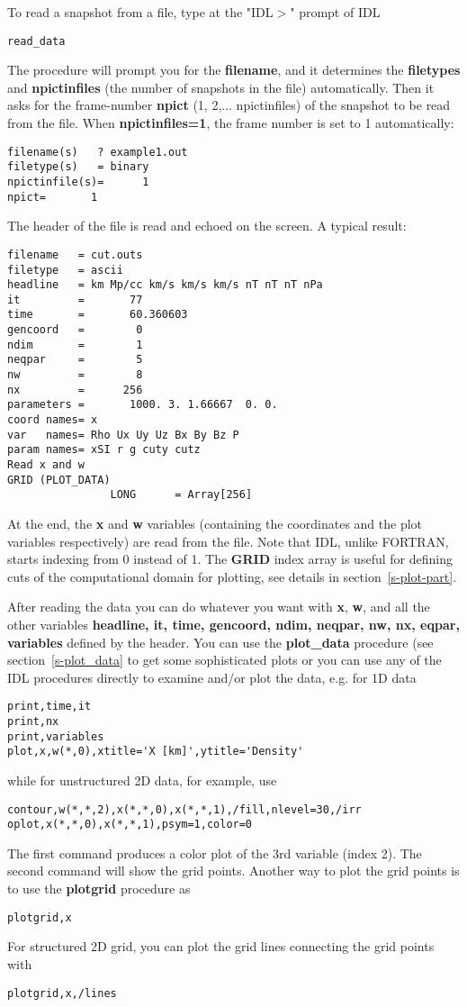 \documentclass{article}
\begin{document}
   To read a snapshot from a file, type at the "IDL$>$" prompt of IDL
\begin{verbatim}
read_data
\end{verbatim}
   The procedure will prompt you for the {\bf filename}, 
   and it determines the {\bf filetypes} and {\bf npictinfiles}
   (the number of snapshots in the file) automatically. Then it asks for
   the frame-number {\bf npict} (1, 2,... npictinfiles) 
   of the snapshot to be read from the file. When {\bf npictinfiles=1},
   the frame number is set to 1 automatically:
\begin{verbatim}
filename(s)   ? example1.out
filetype(s)   = binary
npictinfile(s)=      1
npict=       1
\end{verbatim}
   The header of the file is read and echoed on the screen. 
   A typical result:
\begin{verbatim}
filename   = cut.outs
filetype   = ascii
headline   = km Mp/cc km/s km/s km/s nT nT nT nPa
it         =       77
time       =       60.360603
gencoord   =        0
ndim       =        1
neqpar     =        5
nw         =        8
nx         =      256
parameters =       1000. 3. 1.66667  0. 0.
coord names= x
var   names= Rho Ux Uy Uz Bx By Bz P
param names= xSI r g cuty cutz
Read x and w
GRID (PLOT_DATA)
                LONG      = Array[256]
\end{verbatim}
   At the end, the {\bf x} and {\bf w} variables (containing the coordinates 
   and the plot variables respectively) are read from the file. 
   Note that IDL, unlike FORTRAN, starts indexing from 0 instead of 1. 
   The {\bf GRID} index array is useful for defining
   cuts of the computational domain for plotting, see details 
   in section~\ref{s-plot-part}. 

   After reading the data you can do whatever you want with {\bf x}, {\bf w}, 
   and all the other variables 
   {\bf headline, it, time, gencoord, ndim, neqpar, nw, nx, eqpar, variables}
   defined by the header. 
   You can use the {\bf plot\_data} procedure (see section~\ref{s-plot_data}
   to get some sophisticated plots or you can use any of the IDL procedures 
   directly to examine and/or plot the data, e.g. for 1D data
\begin{verbatim}
print,time,it
print,nx
print,variables
plot,x,w(*,0),xtitle='X [km]',ytitle='Density'
\end{verbatim}
   while for unstructured 2D data, for example, use
\begin{verbatim}
contour,w(*,*,2),x(*,*,0),x(*,*,1),/fill,nlevel=30,/irr
oplot,x(*,*,0),x(*,*,1),psym=1,color=0
\end{verbatim}
   The first command produces a color plot of the 3rd variable (index 2).
   The second command will show the grid points. Another way to plot the
   grid points is to use the {\bf plotgrid} procedure as
\begin{verbatim}
plotgrid,x
\end{verbatim}
   For structured 2D grid, you can plot the grid lines connecting
   the grid points with 
\begin{verbatim}
plotgrid,x,/lines
\end{verbatim}
\end{document}
